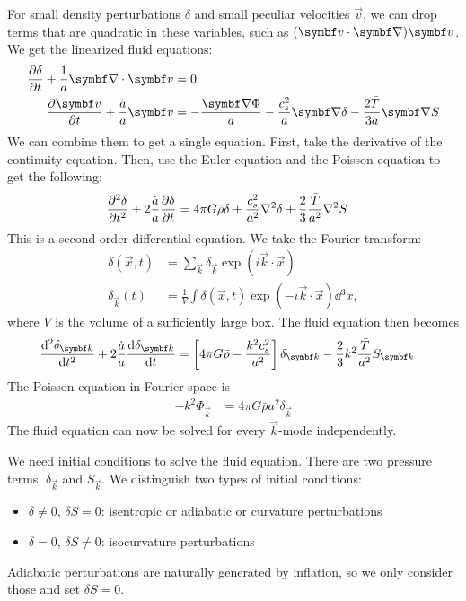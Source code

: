 For small density perturbations $\delta$ and small peculiar velocities $\vec{v}$, we can drop terms that are quadratic in these variables, such as $(\vec{v} \cdot \Grad) \vec{v}$. We get the linearized fluid equations:
\begin{align*}
	\pdv{\delta}{t} + \frac{1}{a} \Div \vec{v} &= 0\\
	\pdv{\vec{v}}{t} + \frac{\dot{a}}{a} \vec{v} &= - \frac{\Grad \Phi}{a} - \frac{c_s^2}{a} \Grad \delta - \frac{2 \bar{T}}{3a} \Grad S
\end{align*}
We can combine them to get a single equation. First, take the derivative of the continuity equation. Then, use the Euler equation and the Poisson equation to get the following:
\begin{align*}
	\pdv[2]{\delta}{t} + 2 \frac{\dot{a}}{a} \pdv{\delta}{t} &= 4 \pi G \bar{\rho} \delta + \frac{c_s^2}{a^2} \Lap \delta + \frac{2}{3} \frac{\bar{T}}{a^2} \Lap S
\end{align*}
This is a second order differential equation. We take the Fourier transform:
\begin{align*}
	\delta(\vec{x},t) &= \sum_{\vec{k}} \delta_{\vec{k}} \exp(i \vec{k} \cdot \vec{x})\\
	\delta_{\vec{k}}(t) &= \frac{1}{V} \int \delta(\vec{x},t) \exp(-i \vec{k} \cdot \vec{x}) \dd{^3x},
\end{align*}
where $V$ is the volume of a sufficiently large box. The fluid equation then becomes
\begin{align*}
	\dv[2]{\delta_{\vec{k}}}{t} + 2 \frac{\dot{a}}{a} \dv{\delta_{\vec{k}}}{t}
	&= \left[4 \pi G \bar{\rho} - \frac{k^2 c_s^2}{a^2}\right] \delta_{\vec{k}} - \frac{2}{3} k^2 \frac{\bar{T}}{a^2} S_{\vec{k}}
\end{align*}
The Poisson equation in Fourier space is
\begin{align*}
	- k^2 \Phi_{\vec{k}} &= 4 \pi G \bar{\rho} a^2 \delta_{\vec{k}}
\end{align*}
The fluid equation can now be solved for every $\vec{k}$-mode independently.


We need initial conditions to solve the fluid equation. There are two pressure terms, $\delta_{\vec{k}}$ and $S_{\vec{k}}$. We distinguish two types of initial conditions:
\begin{itemize}
	\item $\delta \neq 0$, $\delta S = 0$: isentropic or adiabatic or curvature perturbations
	\item $\delta = 0$, $\delta S \neq 0$: isocurvature perturbations
\end{itemize}
Adiabatic perturbations are naturally generated by inflation, so we only consider those and set $\delta S = 0$.

